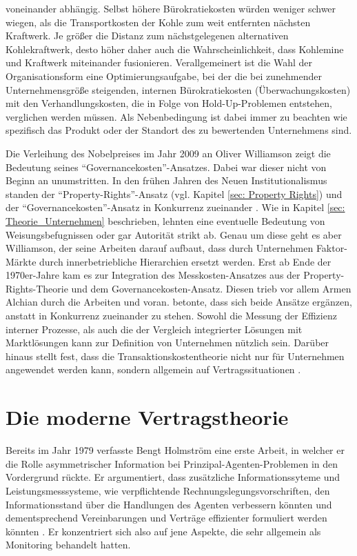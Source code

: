 voneinander abhängig. Selbst höhere Bürokratiekosten würden weniger schwer wiegen, als die Transportkosten der Kohle zum weit entfernten nächsten Kraftwerk. Je größer die Distanz zum nächstgelegenen alternativen Kohlekraftwerk, desto höher daher auch die Wahrscheinlichkeit, dass Kohlemine und Kraftwerk miteinander fusionieren. Verallgemeinert ist die Wahl der Organisationsform eine Optimierungsaufgabe, bei der die bei zunehmender Unternehmensgröße steigenden, internen Bürokratiekosten (Überwachungskosten) mit den Verhandlungskosten, die in Folge von Hold-Up-Problemen entstehen, verglichen werden müssen. Als Nebenbedingung ist dabei immer zu beachten wie spezifisch das Produkt oder der Standort des zu bewertenden Unternehmens sind. 
 
Die Verleihung des Nobelpreises im Jahr 2009 an Oliver Williamson zeigt die Bedeutung seines "`Governancekosten"'-Ansatzes. Dabei war dieser nicht von Beginn an unumstritten. In den frühen Jahren des Neuen Institutionalismus standen der "`Property-Rights"'-Ansatz (vgl. Kapitel \ref{sec: Property Rights}) und der "`Governancekosten"'-Ansatz in Konkurrenz zueinander \parencite[S. 190]{Erlei2016}. Wie in Kapitel \ref{sec: Theorie_Unternehmen} beschrieben, lehnten \textcite{Alchian1972} eine eventuelle Bedeutung von Weisungsbefugnissen oder gar Autorität strikt ab. Genau um diese geht es aber Williamson, der seine Arbeiten darauf aufbaut, dass durch Unternehmen Faktor-Märkte durch innerbetriebliche Hierarchien ersetzt werden. Erst ab Ende der 1970er-Jahre kam es zur Integration des Messkosten-Ansatzes aus der Property-Rights-Theorie und dem Governancekosten-Ansatz. Diesen trieb vor allem Armen Alchian durch die Arbeiten \textcite{Klein1978} und \textcite{Alchian1984} voran. \textcite{Alchian1984} betonte, dass sich beide Ansätze ergänzen, anstatt in Konkurrenz zueinander zu stehen. Sowohl die Messung der Effizienz interner Prozesse, als auch die der Vergleich integrierter Lösungen mit Marktlösungen kann zur Definition von Unternehmen nützlich sein. Darüber hinaus stellt \textcite{Alchian1984} fest, dass die Transaktionskostentheorie nicht nur für Unternehmen angewendet werden kann, sondern allgemein auf Vertragssituationen \parencite[S. 190]{Erlei2016}. 

\section{Die moderne Vertragstheorie}
\label{sec: Moderne Vertragstheorie}

Bereits im Jahr 1979 verfasste Bengt Holmström eine erste Arbeit, in welcher er die Rolle asymmetrischer Information bei Prinzipal-Agenten-Problemen in den Vordergrund rückte. Er argumentiert, dass zusätzliche Informationssyteme und Leistungsmesssysteme, wie verpflichtende Rechnungslegungsvorschriften, den Informationsstand über die Handlungen des Agenten verbessern könnten und dementsprechend Vereinbarungen und Verträge effizienter formuliert werden könnten \parencite[S. 89]{Holmstrom1979}. Er konzentriert sich also auf jene Aspekte, die \textcite{Jensen1976} sehr allgemein als Monitoring behandelt hatten.

